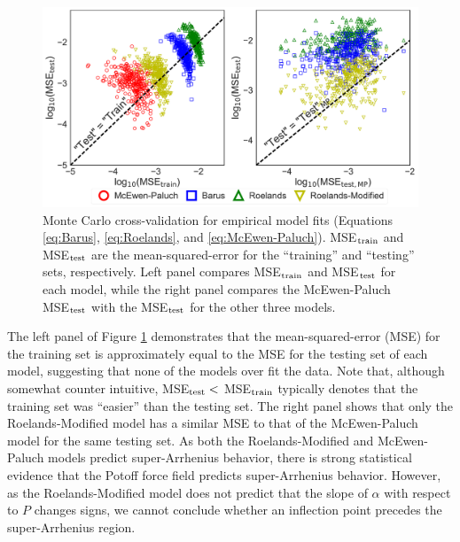 \documentclass[preprint,review,12pt]{elsarticle}
\begin{document}
	\begin{figure}[htb!]
		\centering
		\includegraphics[width=6.4in]{cross_validation.pdf}
		\caption{Monte Carlo cross-validation for empirical model fits (Equations \ref{eq:Barus}, \ref{eq:Roelands}, and \ref{eq:McEwen-Paluch}). MSE$_{\rm train}$ and MSE$_{\rm test}$ are the mean-squared-error for the ``training'' and ``testing'' sets, respectively. Left panel compares MSE$_{\rm train}$ and MSE$_{\rm test}$ for each model, while the right panel compares the McEwen-Paluch MSE$_{\rm test}$ with the MSE$_{\rm test}$ for the other three models.}
		\label{fig:cross_validation}
	\end{figure}
	
	The left panel of Figure \ref{fig:cross_validation} demonstrates that the mean-squared-error (MSE) for the training set is approximately equal to the MSE for the testing set of each model, suggesting that none of the models over fit the data. Note that, although somewhat counter intuitive, MSE$_{\rm test} < $ MSE$_{\rm train}$ typically denotes that the training set was ``easier'' than the testing set. The right panel shows that only the Roelands-Modified model has a similar MSE to that of the McEwen-Paluch model for the same testing set. As both the Roelands-Modified and McEwen-Paluch models predict super-Arrhenius behavior, there is strong statistical evidence that the Potoff force field predicts super-Arrhenius behavior. However, as the Roelands-Modified model does not predict that the slope of $\alpha$ with respect to $P$ changes signs, we cannot conclude whether an inflection point precedes the super-Arrhenius region.
	
	
	
\end{document}
